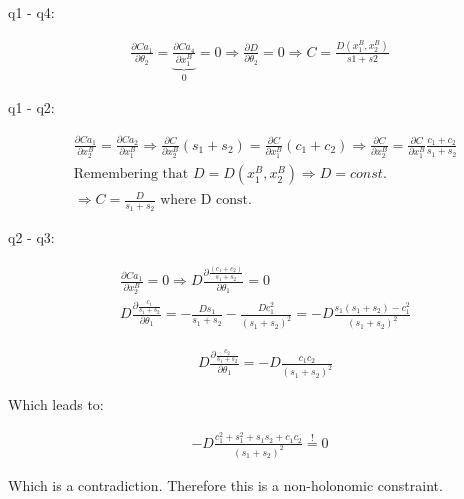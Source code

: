 q1 - q4:

\begin{equation}
    \begin{split}
        \frac{\partial C a_1}{\partial \theta_2} = \underbrace{\frac{\partial C a_4}{\partial x_1^B}}_{0} = 0 \Rightarrow \frac{\partial D}{\partial \theta_2} = 0 \Rightarrow C = \frac{D(x_1^B,x_2^B)}{s1 + s2}
    \end{split}
\end{equation}

q1 - q2:

\begin{equation}
    \begin{split}
        &\frac{\partial C a_1}{\partial x_2^B} = \frac{\partial C a_2}{\partial x_1^B}\Rightarrow \frac{\partial C}{\partial x_2^B}\left(s_1+s_2\right) = \frac{\partial C}{\partial x_1^B}\left(c_1+c_2\right) \Rightarrow \frac{\partial C}{\partial x_2^B} = \frac{\partial C}{\partial x_1^B}\frac{c_1+c_2}{s_1+s_2}\\
        &\text{Remembering that } D = D(x_1^B,x_2^B) \Rightarrow D = const.\\
        & \Rightarrow C = \frac{D}{s_1 + s_2} \text{ where D const.}
    \end{split}
\end{equation}

q2 - q3:

\begin{equation}
    \begin{split}
        &\frac{\partial C a_1}{\partial x_2^B}  = 0 \Rightarrow D\frac{\partial\frac{
        (c_1+c_2)}{s_1+s_2}}{\partial \theta_1} = 0\\
        &D\frac{\partial \frac{c_1}{s_1+s_2}}{\partial\theta_1} = -\frac{Ds_1}{s_1+s_2} - \frac{Dc_1^2}{(s_1+s_2)^2} = -D\frac{s_1(s_1+s_2) - c_1^2}{(s_1+s_2)^2}
    \end{split}
\end{equation}

\begin{equation}
    \begin{split}
        &D\frac{\partial \frac{c_2}{s_1+s_2}}{\partial\theta_1} = -D\frac{c_1c_2}{(s_1+s_2)^2}
    \end{split}
\end{equation}

Which leads to:

\begin{equation}
    \begin{split}
        -D\frac{c_1^2 + s_1^2 + s_1s_2 + c_1c_2}{(s_1+s_2)^2} \overset{\text{!}}{=} 0
    \end{split}
\end{equation}

Which is a contradiction. Therefore this is a non-holonomic constraint.

